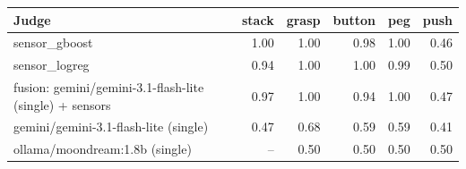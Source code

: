 \begin{tabular}{lrrrrr}
\toprule
Judge & stack & grasp & button & peg & push \\
\midrule
sensor\_gboost & 1.00 & 1.00 & 0.98 & 1.00 & 0.46 \\
sensor\_logreg & 0.94 & 1.00 & 1.00 & 0.99 & 0.50 \\
fusion: gemini/gemini-3.1-flash-lite (single) + sensors & 0.97 & 1.00 & 0.94 & 1.00 & 0.47 \\
gemini/gemini-3.1-flash-lite (single) & 0.47 & 0.68 & 0.59 & 0.59 & 0.41 \\
ollama/moondream:1.8b (single) & -- & 0.50 & 0.50 & 0.50 & 0.50 \\
\bottomrule
\end{tabular}